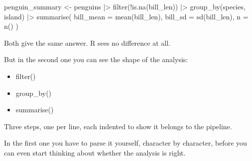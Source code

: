\documentclass[
  letterpaper,
  justified,
  a4paper]{tufte-book}
\makeatletter
\newenvironment{Shaded}{\begin{snugshade}}{\end{snugshade}}
\newcommand{\AttributeTok}[1]{\textcolor[rgb]{0.40,0.45,0.13}{#1}}
\newcommand{\FunctionTok}[1]{\textcolor[rgb]{0.28,0.35,0.67}{#1}}
\newcommand{\NormalTok}[1]{\textcolor[rgb]{0.00,0.23,0.31}{#1}}
\newcommand{\OtherTok}[1]{\textcolor[rgb]{0.00,0.23,0.31}{#1}}
\newcommand{\SpecialCharTok}[1]{\textcolor[rgb]{0.37,0.37,0.37}{#1}}
\providecommand{\tightlist}{%
  \setlength{\itemsep}{0pt}\setlength{\parskip}{0pt}}
\providecommand{\tightlist}{%
  \setlength{\itemsep}{0pt}\setlength{\parskip}{0pt}}
\let\rbporigShaded\Shaded
\let\rbporigendShaded\endShaded
\renewenvironment{Shaded}{%
  \begingroup
  \ifdim\linewidth=\rbpbodywidth
    \advance\linewidth by \@tufte@overhang
    \advance\hsize by \@tufte@overhang
    \advance\columnwidth by \@tufte@overhang
  \fi
  \rbporigShaded
}{%
  \rbporigendShaded
  \endgroup
}
\makeatother
\begin{document}
\begin{Shaded}
\begin{Highlighting}[]
\NormalTok{penguin\_summary }\OtherTok{\textless{}{-}}\NormalTok{ penguins }\SpecialCharTok{|\textgreater{}}
  \FunctionTok{filter}\NormalTok{(}\SpecialCharTok{!}\FunctionTok{is.na}\NormalTok{(bill\_len)) }\SpecialCharTok{|\textgreater{}}
  \FunctionTok{group\_by}\NormalTok{(species, island) }\SpecialCharTok{|\textgreater{}}
  \FunctionTok{summarise}\NormalTok{(}
    \AttributeTok{bill\_mean =} \FunctionTok{mean}\NormalTok{(bill\_len),}
    \AttributeTok{bill\_sd =} \FunctionTok{sd}\NormalTok{(bill\_len),}
    \AttributeTok{n =} \FunctionTok{n}\NormalTok{()}
\NormalTok{  )}
\end{Highlighting}
\end{Shaded}

Both give the same answer. R sees no difference at all.

But in the second one you can see the shape of the analysis:

\begin{itemize}
\tightlist
\item
  filter()
\item
  group\_by()
\item
  summarise()
\end{itemize}

Three steps, one per line, each indented to show it belongs to the
pipeline.

In the first one you have to parse it yourself, character by character,
before you can even start thinking about whether the analysis is right.
\end{document}
